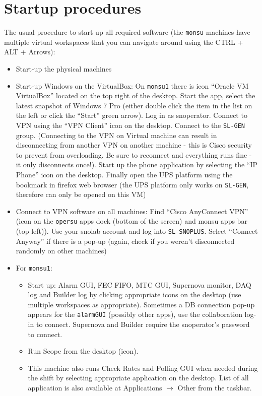 \documentclass[12pt, oneside, a4paper]{article}
\begin{document}
\section{Startup procedures}
The usual procedure to start up all required software (the {\tt monsu} machines have multiple virtual workspaces that you can navigate around using the CTRL + ALT + Arrows):
\begin{itemize}
	\item Start-up the physical machines
	\item Start-up Windows on the VirtualBox: On {\tt monsu1} there is icon ``Oracle VM VirtualBox'' located on the top right of the desktop. Start the app, select the latest snapshot of Windows 7 Pro (either double click the item in the list on the left or click the ``Start'' green arrow). Log in as snoperator. Connect to VPN using the ``VPN Client'' icon on the desktop. Connect to the {\tt SL-GEN} group. (Connecting to the VPN on Virtual machine can result in disconnecting from another VPN on another machine - this is Cisco security to prevent from overloading. Be sure to reconnect and everything runs fine - it only disconnects once!). Start up the phone application by selecting the ``IP Phone'' icon on the desktop. Finally open the UPS platform using the bookmark in firefox web browser (the UPS platform only works on {\tt SL-GEN}, therefore can only be opened on this VM)
	\item Connect to VPN software on all machines: Find ``Cisco AnyConnect VPN'' (icon on the {\tt opersu} apps dock (bottom of the screen) and monsu apps bar (top left)). Use your snolab account and log into {\tt SL-SNOPLUS}. Select ``Connect Anyway'' if there is a pop-up (again, check if you weren't disconnected randomly on other machines)
	\item For {\tt monsu1}:
	\begin{itemize}
		\item Start up: Alarm GUI, FEC FIFO, MTC GUI, Supernova monitor, DAQ log and Builder log by clicking appropriate icons on the desktop (use multiple workspaces as appropriate). Sometimes a DB connection pop-up appears for the {\tt alarmGUI} (possibly other apps), use the collaboration log-in to connect. Supernova and Builder require the snoperator's password to connect.		
			\item Run Scope from the desktop (icon).
			\item This machine also runs Check Rates and Polling GUI when needed during the shift by selecting appropriate application on the desktop. List of all application is also available at Applications $\rightarrow$ Other from the taskbar.

\end{itemize}
\end{itemize}
\end{document}
